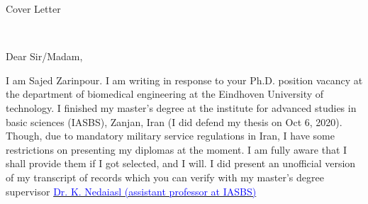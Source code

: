 \documentclass{resume} %
\begin{document}

\begin{cSection}{Cover Letter}
	
	\\	
	
	\vspace*{1.5em}
	
	\small
	Dear Sir/Madam, \vspace*{0.5em}
	
	I am Sajed Zarinpour. I am writing in response to your Ph.D. position vacancy at the department of biomedical engineering at the Eindhoven University of technology.
	I finished my master's degree at the institute for advanced studies in basic sciences (IASBS), Zanjan, Iran (I did defend my thesis on Oct 6, 2020). Though, due to mandatory military service regulations in Iran, I have some restrictions on presenting my diplomas at the moment. I am fully aware that I shall provide them if I got selected, and I will. I did present an unofficial version of my transcript of records which you can verify with my master's degree supervisor \href{https://iasbs.ac.ir/personalpage?id=31016&staff=0}{\textcolor{blue}{Dr. K. Nedaiasl (assistant professor at IASBS)}}
	

\end{cSection}
\end{document}
